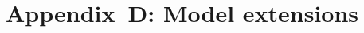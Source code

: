 \documentclass[default,sn-standardnature]{sn-jnl}
\begin{document}
\title{}









\renewcommand{\figurename}{Supplementary Figure}
\renewcommand{\appendixname}{Appendix~\Alph{section}}
\setcounter{section}{0}

\newpage
\section*{Appendix~D: Model extensions}\label{secS5}
\renewcommand{\thefigure}{D\arabic{figure}}
\renewcommand{\thetable}{D\arabic{table}}
\setcounter{figure}{0}
\setcounter{table}{0}




\label{bib}
\end{document}
